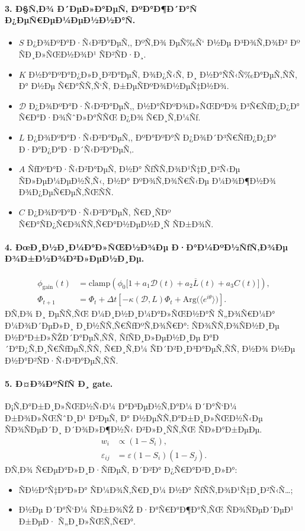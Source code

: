 \paragraph{3. Ð§Ñ‚Ð¾ Ð´ÐµÐ»Ð°ÐµÑ‚ ÐºÐ°Ð¶Ð´Ð°Ñ Ð¿ÐµÑ€ÐµÐ¼ÐµÐ½Ð½Ð°Ñ.}
\begin{itemize}
    \item $S$ Ð¿Ð¾ÐºÐ°Ð·Ñ‹Ð²Ð°ÐµÑ‚, ÐºÑ‚Ð¾ ÐµÑ‰Ñ‘ Ð½Ðµ Ð³Ð¾Ñ‚Ð¾Ð² Ðº ÑÐ¸Ð»ÑŒÐ½Ð¾Ð¹ ÑÐ²ÑÐ·Ð¸.
    \item $K$ Ð½Ð°ÐºÐ°Ð¿Ð»Ð¸Ð²Ð°ÐµÑ‚ Ð¾Ð¿Ñ‹Ñ‚ Ð¸ Ð½Ð°ÑÑ‹Ñ‰Ð°ÐµÑ‚ÑÑ, Ð° Ð½Ðµ Ñ€Ð°ÑÑ‚Ñ‘Ñ‚ Ð±ÐµÑÐºÐ¾Ð½ÐµÑ‡Ð½Ð¾.
    \item $\mathcal{D}$ Ð¿Ð¾ÐºÐ°Ð·Ñ‹Ð²Ð°ÐµÑ‚, Ð½Ð°ÑÐºÐ¾Ð»ÑŒÐºÐ¾ Ð³Ñ€ÑƒÐ¿Ð¿Ð° Ñ€Ð°Ð·Ð¾ÑˆÐ»Ð°ÑÑŒ Ð¿Ð¾ Ñ€Ð¸Ñ‚Ð¼Ñƒ.
    \item $L$ Ð¿Ð¾ÐºÐ°Ð·Ñ‹Ð²Ð°ÐµÑ‚, ÐºÐ°ÐºÐ°Ñ Ð¿Ð¾Ð´Ð³Ñ€ÑƒÐ¿Ð¿Ð° Ð·Ð°Ð¿Ð°Ð·Ð´Ñ‹Ð²Ð°ÐµÑ‚.
    \item $A$ ÑƒÐºÐ°Ð·Ñ‹Ð²Ð°ÐµÑ‚ Ð½Ð° ÑƒÑÑ‚Ð¾Ð¹Ñ‡Ð¸Ð²Ñ‹Ðµ ÑÐ»ÐµÐ¼ÐµÐ½Ñ‚Ñ‹, Ð½Ð° ÐºÐ¾Ñ‚Ð¾Ñ€Ñ‹Ðµ Ð¼Ð¾Ð¶Ð½Ð¾ Ð¾Ð¿ÐµÑ€ÐµÑ‚ÑŒÑÑ.
    \item $C$ Ð¿Ð¾ÐºÐ°Ð·Ñ‹Ð²Ð°ÐµÑ‚ Ñ€Ð¸ÑÐº Ñ€Ð°ÑÐ¿Ñ€Ð¾ÑÑ‚Ñ€Ð°Ð½ÐµÐ½Ð¸Ñ ÑÐ±Ð¾Ñ.
\end{itemize}

\paragraph{4. ÐœÐ¸Ð½Ð¸Ð¼Ð°Ð»ÑŒÐ½Ð¾Ðµ Ð·Ð°Ð¼ÐºÐ½ÑƒÑ‚Ð¾Ðµ Ð¾Ð±Ð½Ð¾Ð²Ð»ÐµÐ½Ð¸Ðµ.}
\begin{align}
\phi_{\mathrm{gain}}(t) &= \mathrm{clamp}\!\left(\phi_0\bigl[1+a_1\mathcal{D}(t)+a_2\overline{L}(t)+a_3 C(t)\bigr]\right), \\
\Phi_{t+1} &= \Phi_t + \Delta t\left[-\kappa(\mathcal{D},L)\Phi_t + \mathrm{Arg}\bigl(\langle e^{i\theta}\rangle\bigr)\right].
\end{align}
Ð­Ñ‚Ð¾ Ð¸ ÐµÑÑ‚ÑŒ Ð¼Ð¸Ð½Ð¸Ð¼Ð°Ð»ÑŒÐ½Ð°Ñ Ñ„Ð¾Ñ€Ð¼Ð° Ð¼Ð¾Ð´ÐµÐ»Ð¸ Ð¸Ð½ÑÑ‚Ñ€ÑƒÐºÑ‚Ð¾Ñ€Ð°: ÑÐ¾ÑÑ‚Ð¾ÑÐ½Ð¸Ðµ Ð½Ð°Ð±Ð»ÑŽÐ´Ð°ÐµÑ‚ÑÑ, ÑƒÑÐ¸Ð»ÐµÐ½Ð¸Ðµ Ð°Ð´Ð°Ð¿Ñ‚Ð¸Ñ€ÑƒÐµÑ‚ÑÑ, Ñ€Ð¸Ñ‚Ð¼ ÑÐ´Ð²Ð¸Ð³Ð°ÐµÑ‚ÑÑ, Ð½Ð¾ Ð½Ðµ Ð½Ð°Ð²ÑÐ·Ñ‹Ð²Ð°ÐµÑ‚ÑÑ.

\paragraph{5. Ð¤Ð¾ÐºÑƒÑ Ð¸ gate.}
Ð¡Ñ‚Ð°Ð±Ð¸Ð»ÑŒÐ½Ñ‹Ð¼ Ð°Ð³ÐµÐ½Ñ‚Ð°Ð¼ Ð´Ð°Ñ‘Ð¼ Ð±Ð¾Ð»ÑŒÑˆÐ¸Ð¹ Ð²ÐµÑ, Ð° Ð½ÐµÑÑ‚Ð°Ð±Ð¸Ð»ÑŒÐ½Ñ‹Ðµ ÑÐ¾ÑÐµÐ´Ð¸ Ð´Ð¾Ð»Ð¶Ð½Ñ‹ Ð²Ð»Ð¸ÑÑ‚ÑŒ ÑÐ»Ð°Ð±ÐµÐµ.
\begin{align}
w_i &\propto (1-S_i), \\
\varepsilon_{ij} &= \varepsilon(1-S_i)(1-S_j).
\end{align}
Ð­Ñ‚Ð¾ Ñ€ÐµÐ°Ð»Ð¸Ð·ÑƒÐµÑ‚ Ð´Ð²Ð° Ð¿Ñ€Ð°Ð²Ð¸Ð»Ð°:
\begin{itemize}
    \item ÑÐ½Ð°Ñ‡Ð°Ð»Ð° ÑÐ¼Ð¾Ñ‚Ñ€Ð¸Ð¼ Ð½Ð° ÑƒÑÑ‚Ð¾Ð¹Ñ‡Ð¸Ð²Ñ‹Ñ…;
    \item Ð½Ðµ Ð´Ð°Ñ‘Ð¼ ÑÐ±Ð¾ÑŽ Ð·Ð°Ñ€Ð°Ð¶Ð°Ñ‚ÑŒ ÑÐ¾ÑÐµÐ´ÐµÐ¹ Ð±ÐµÐ· Ñ„Ð¸Ð»ÑŒÑ‚Ñ€Ð°.
\end{itemize}

